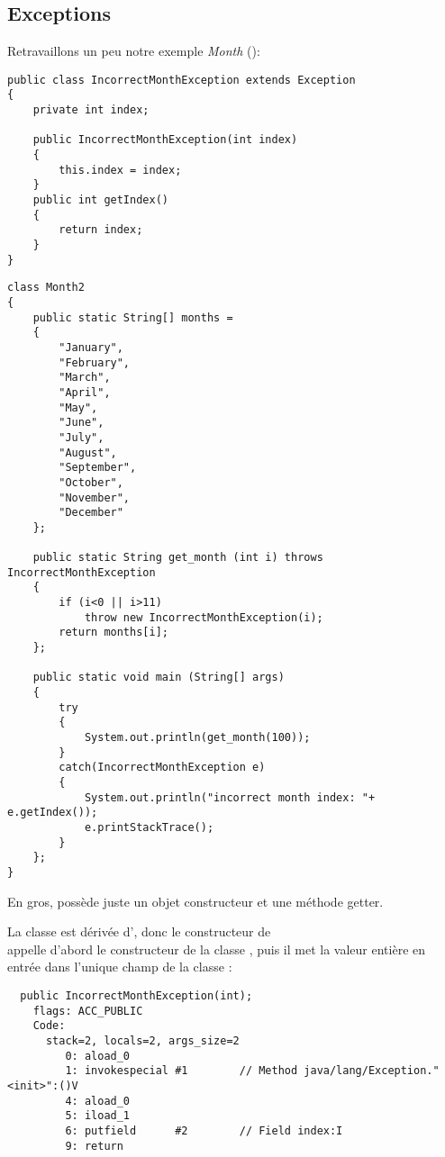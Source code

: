 \subsection{Exceptions}

Retravaillons un peu notre exemple \emph{Month} ():

\begin{lstlisting}[caption=IncorrectMonthException.java,style=customjava]
public class IncorrectMonthException extends Exception
{
	private int index;

	public IncorrectMonthException(int index)
	{
		this.index = index;
	}
	public int getIndex()
	{
		return index;
	}
}
\end{lstlisting}

\begin{lstlisting}[caption=Month2.java,style=customjava]
class Month2
{
	public static String[] months =
	{
		"January",
		"February",
		"March",
		"April",
		"May",
		"June",
		"July",
		"August",
		"September",
		"October",
		"November",
		"December"
	};

	public static String get_month (int i) throws IncorrectMonthException
	{
		if (i<0 || i>11)
			throw new IncorrectMonthException(i);
		return months[i];
	};

	public static void main (String[] args)
	{
		try
		{
			System.out.println(get_month(100));
		}
		catch(IncorrectMonthException e)
		{
			System.out.println("incorrect month index: "+ e.getIndex());
			e.printStackTrace();
		}
	};
}
\end{lstlisting}

En gros,   possède juste un objet constructeur
et une méthode getter.

La classe  est dérivée d', donc le constructeur
de\\
 appelle d'abord le constructeur de la classe ,
puis il met la valeur entière en entrée dans l'unique champ de la classe :

\begin{lstlisting}
  public IncorrectMonthException(int);
    flags: ACC_PUBLIC
    Code:
      stack=2, locals=2, args_size=2
         0: aload_0
         1: invokespecial #1        // Method java/lang/Exception."<init>":()V
         4: aload_0
         5: iload_1
         6: putfield      #2        // Field index:I
         9: return
\end{lstlisting}

